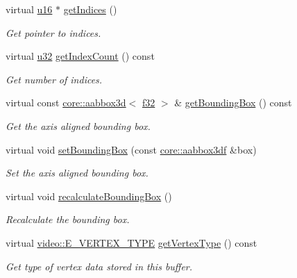 \begin{DoxyCompactItemize}
virtual \hyperlink{namespaceirr_ae9f8ec82692ad3b83c21f555bfa70bcc}{u16} $\ast$ \hyperlink{classirr_1_1scene_1_1CMeshBuffer_a34a85f4868776d4cf312cdece5326c89}{get\+Indices} ()
\begin{DoxyCompactList}\small\item\em Get pointer to indices. \end{DoxyCompactList}\item 
virtual \hyperlink{namespaceirr_a0416a53257075833e7002efd0a18e804}{u32} \hyperlink{classirr_1_1scene_1_1CMeshBuffer_ac5585f4983423a4ba1f4ab4aba112c95}{get\+Index\+Count} () const
\begin{DoxyCompactList}\small\item\em Get number of indices. \end{DoxyCompactList}\item 
virtual const \hyperlink{classirr_1_1core_1_1aabbox3d}{core\+::aabbox3d}$<$ \hyperlink{namespaceirr_a0277be98d67dc26ff93b1a6a1d086b07}{f32} $>$ \& \hyperlink{classirr_1_1scene_1_1CMeshBuffer_a759863b44c024f79747019f492a5c7cf}{get\+Bounding\+Box} () const
\begin{DoxyCompactList}\small\item\em Get the axis aligned bounding box. \end{DoxyCompactList}\item 
virtual void \hyperlink{classirr_1_1scene_1_1CMeshBuffer_ab5a21d48a5af73f1ef880a48c3798a67}{set\+Bounding\+Box} (const \hyperlink{namespaceirr_1_1core_a60f4b4c744aba55f10530d503c6ecb04}{core\+::aabbox3df} \&box)
\begin{DoxyCompactList}\small\item\em Set the axis aligned bounding box. \end{DoxyCompactList}\item 
virtual void \hyperlink{classirr_1_1scene_1_1CMeshBuffer_aad55263eaf019b090c8d1c3c5f7f4407}{recalculate\+Bounding\+Box} ()
\begin{DoxyCompactList}\small\item\em Recalculate the bounding box. \end{DoxyCompactList}\item 
virtual \hyperlink{namespaceirr_1_1video_a0e3b59e025e0d0db0ed2ee0ce904deac}{video\+::\+E\+\_\+\+V\+E\+R\+T\+E\+X\+\_\+\+T\+Y\+PE} \hyperlink{classirr_1_1scene_1_1CMeshBuffer_a341db661218a49d8d8fd12550700cb67}{get\+Vertex\+Type} () const
\begin{DoxyCompactList}\small\item\em Get type of vertex data stored in this buffer. \end{DoxyCompactList}\item 

\end{DoxyCompactItemize}

